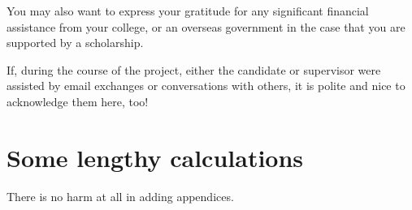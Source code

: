 \documentclass[aps,prd,reprint,preprintnumbers,showpacs,floatfix,nofootinbib,superscript address]{revtex4-2}
\begin{document}
You may also want to express your gratitude for any significant financial assistance from your college, or an overseas government in the case that you are supported by a scholarship.

If, during the course of the project, either the candidate or supervisor were assisted by email exchanges or conversations with others, it is polite and nice to acknowledge them here, too!




\appendix
\section{Some lengthy calculations}
There is no harm at all in adding appendices.
\end{document}
